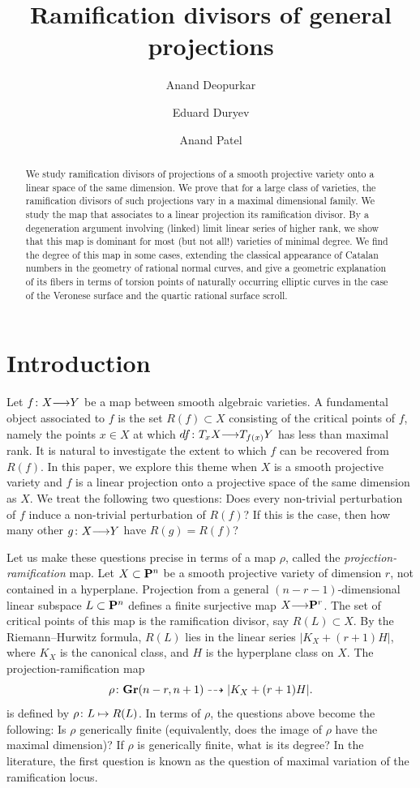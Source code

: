\documentclass[11pt,reqno]{amsart}
\title[Projection and ramification]{Ramification divisors of general projections}
\author[Deopurkar]{Anand Deopurkar}
\author[Duryev]{Eduard Duryev}
\author[Patel]{Anand Patel}
\theoremstyle{plain}
\theoremstyle{definition}
\theoremstyle{remark}
\numberwithin{equation}{section}
\renewcommand{\to}{{\longrightarrow}}
\numberwithin{equation}{section}
\begin{document}
\begin{abstract}
  We study ramification divisors of projections of a smooth projective variety onto a linear space of the same dimension.
  We prove that for a large class of varieties, the ramification divisors of such projections vary in a maximal dimensional family.
  We study the map that associates to a linear projection its ramification divisor.
  By a degeneration argument involving (linked) limit linear series of higher rank, we show that this map is dominant for most (but not all!) varieties of minimal degree. 
  We find the degree of this map in some cases, extending the classical appearance of Catalan numbers in the geometry of rational normal curves, and give a geometric explanation of its fibers in terms of torsion points of naturally occurring elliptic curves in the case of the Veronese surface and the quartic rational surface scroll.
\end{abstract}


\maketitle

\section{Introduction}\label{sec:intro}
Let $f \from X \to Y$ be a map between smooth algebraic varieties.
A fundamental object associated to $f$ is the set $R(f) \subset X$ consisting of the critical points of $f$, namely the points $x \in X$ at which $df \from T_xX \to T_{f(x)}Y$ has less than maximal rank.
It is natural to investigate the extent to which $f$ can be recovered from $R(f)$.
In this paper, we explore this theme when $X$ is a smooth projective variety and $f$ is a linear projection onto a projective space of the same dimension as $X$.
We treat the following two questions: Does every non-trivial perturbation of $f$ induce a non-trivial perturbation of $R(f)$? If this is the case, then how many other $g \from X \to Y$ have $R(g) = R(f)$?

Let us make these questions precise in terms of a map $\rho$, called the \emph{projection-ramification} map.
Let $X \subset \P^n$ be a smooth projective variety of dimension $r$, not contained in a hyperplane.
Projection from a general $(n-r-1)$-dimensional linear subspace $L \subset \P^n$ defines a finite surjective map $X \to \P^r$.
The set of critical points of this map is the ramification divisor, say $R(L) \subset X$.
By the Riemann--Hurwitz formula, $R(L)$ lies in the linear series $|K_X + (r+1)H|$, where $K_X$ is the canonical class, and $H$ is the hyperplane class on $X$.
The projection-ramification map
\[
  \rho \from \Gr(n-r, n+1) \dashrightarrow |K_X + (r+1)H|.
\]
is defined by $\rho \from L \mapsto R(L)$.
In terms of $\rho$, the questions above become the following: Is $\rho$ generically finite (equivalently, does the image of $\rho$ have the maximal dimension)? If $\rho$ is generically finite, what is its degree?
In the literature, the first question is known as the question of maximal variation of the ramification locus.
\end{document}
